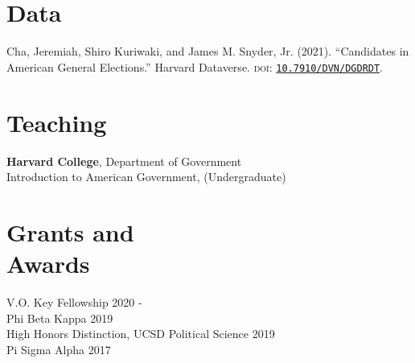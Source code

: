 \documentclass[margin, line]{res}
\begin{document}
\begin{resume}
\section{Data}
\begin{etaremune}
	\item Cha, Jeremiah, Shiro Kuriwaki, and James M. Snyder, Jr. (2021). ``Candidates in American General Elections.'' Harvard Dataverse. \textsc{doi}: \href{https://doi.org/10.7910/DVN/DGDRDT}{\texttt{10.7910/DVN/DGDRDT}}.
\end{etaremune}

\section{Teaching}
\textbf{Harvard College}, Department of Government\\
\hspace*{5mm} Introduction to American Government,  (Undergraduate) 

\section{Grants and \\Awards}
V.O. Key Fellowship \hfill 2020 - \\
Phi Beta Kappa \hfill 2019\\
High Honors Distinction, UCSD Political Science \hfill 2019\\
Pi Sigma Alpha \hfill 2017


\end{resume}
\end{document}
